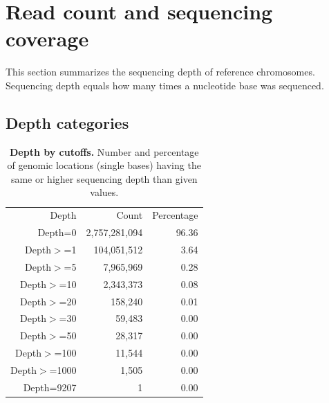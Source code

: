 \documentclass{article}
\begin{document}
\pagebreak
\section{Read count and sequencing coverage}
This section summarizes the sequencing depth of reference chromosomes. Sequencing depth equals how many times a nucleotide base was sequenced.

\subsection{Depth categories}
\begin{table}
\begin{tabular}{|r|r|r|}
  \hline
Depth & Count & Percentage \\ 
  \rowcolor[gray]{0.9} \hline
Depth=0 & 2,757,281,094 & 96.36 \\ 
  Depth$>$=1 & 104,051,512 &  3.64 \\ 
   \rowcolor[gray]{0.9}Depth$>$=5 & 7,965,969 &  0.28 \\ 
  Depth$>$=10 & 2,343,373 &  0.08 \\ 
   \rowcolor[gray]{0.9}Depth$>$=20 & 158,240 &  0.01 \\ 
  Depth$>$=30 & 59,483 &  0.00 \\ 
   \rowcolor[gray]{0.9}Depth$>$=50 & 28,317 &  0.00 \\ 
  Depth$>$=100 & 11,544 &  0.00 \\ 
   \rowcolor[gray]{0.9}Depth$>$=1000 & 1,505 &  0.00 \\ 
  Depth=9207 & 1 &  0.00 \\ 
   \hline
\end{tabular}\caption{\textbf{Depth by cutoffs.} Number and percentage of genomic locations (single bases) having the same or higher sequencing depth than given values.}
\end{table}
\end{document}
